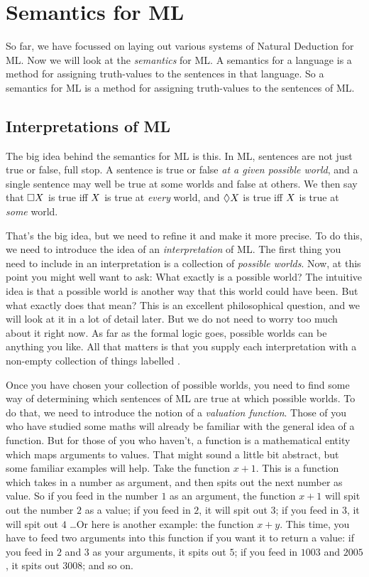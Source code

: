 \chapter{Semantics for ML}
\label{Semantics}

So far, we have focussed on laying out various systems of Natural Deduction for ML. Now we will look at the \emph{semantics} for ML. A semantics for a language is a method for assigning truth-values to the sentences in that language. So a semantics for ML is a method for assigning truth-values to the sentences of ML.

\section{Interpretations of ML}

The big idea behind the semantics for ML is this. In ML, sentences are not just true or false, full stop. A sentence is true or false \emph{at a given possible world}, and a single sentence may well be true at some worlds and false at others. We then say that $\Box X$ is true iff $X$ is true at \emph{every} world, and $\Diamond X$ is true iff $X$ is true at \emph{some} world.

That's the big idea, but we need to refine it and make it more precise. To do this, we need to introduce the idea of an \emph{interpretation} of ML. The first thing you need to include in an interpretation is a collection of \emph{possible worlds}. Now, at this point you might well want to ask: What exactly is a possible world? The intuitive idea is that a possible world is another way that this world could have been. But what exactly does that mean? This is an excellent philosophical question, and we will look at it in a lot of detail later. But we do not need to worry too much about it right now. As far as the formal logic goes, possible worlds can be anything you like. All that matters is that you supply each interpretation with a non-empty collection of things labelled .

Once you have chosen your collection of possible worlds, you need to find some way of determining which sentences of ML are true at which possible worlds. To do that, we need to introduce the notion of a \emph{valuation function}. Those of you who have studied some maths will already be familiar with the general idea of a function. But for those of you who haven't, a function is a mathematical entity which maps arguments to values. That might sound a little bit abstract, but some familiar examples will help. Take the function $x+1$. This is a function which takes in a number as argument, and then spits out the next number as value. So if you feed in the number $1$ as an argument, the function $x+1$ will spit out the number $2$ as a value; if you feed in $2$, it will spit out $3$; if you feed in $3$, it will spit out $4$ \dots  Or here is another example: the function $x+y$. This time, you have to feed two arguments into this function if you want it to return a value: if you feed in $2$ and $3$ as your arguments, it spits out $5$; if you feed in $1003$ and $2005$, it spits out $3008$; and so on.

